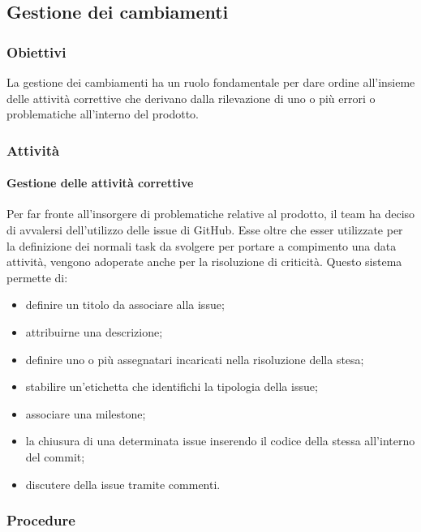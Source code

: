 \subsection{Gestione dei cambiamenti}
\subsubsection{Obiettivi}
La gestione dei cambiamenti ha un ruolo fondamentale per dare ordine all'insieme delle attività correttive che derivano dalla rilevazione di uno o più errori o problematiche all'interno del prodotto.

\subsubsection{Attività}
\paragraph{Gestione delle attività correttive}
Per far fronte all'insorgere di problematiche relative al prodotto, il team ha deciso di avvalersi dell'utilizzo delle issue di GitHub. Esse oltre che esser utilizzate per la definizione dei normali task da svolgere per portare a compimento una data attività, vengono adoperate anche per la risoluzione di criticità. Questo sistema permette di:
\begin{itemize}
	\item definire un titolo da associare alla issue;
	\item attribuirne una descrizione;
	\item definire uno o più assegnatari incaricati nella risoluzione della stesa;
	\item stabilire un'etichetta che identifichi la tipologia della issue;
	\item associare una milestone;
	\item la chiusura di una determinata issue inserendo il codice della stessa all'interno del commit;
	\item discutere della issue tramite commenti.
\end{itemize}

\subsubsection{Procedure}
